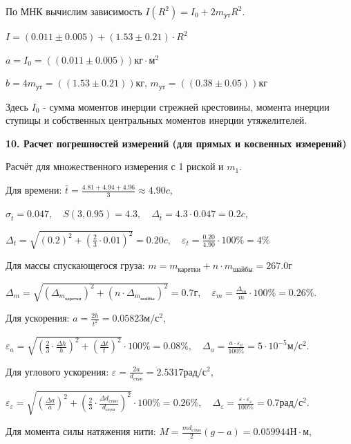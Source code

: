 \documentclass[14pt]{extreport}
\begin{document}
По МНК вычислим зависимость $I(R^2) = I_0+2m_\text{ут}R^2$.

\centerline{$I = (0.011 \pm 0.005)+(1.53 \pm 0.21) \cdot R^2$}

$a = I_0 = ((0.011 \pm 0.005)) \text{кг}\cdot\text{м}^2$

$b = 4m_\text{ут} = ((1.53 \pm 0.21)) \text{кг}$, $m_\text{ут} = ((0.38 \pm 0.05)) \text{кг}$

Здесь $I_0$ - сумма моментов инерции стрежней крестовины, момента инерции ступицы и собственных центральных моментов инерции утяжелителей.

\noindent\textbf{10. Расчет погрешностей измерений (для прямых и косвенных измерений)}

Расчёт для множественного измерения с 1 риской и $m_1$.

Для времени: $\bar{t} = \frac{4.81 + 4.94 + 4.96 }{3} \approx 4.90 c$,

\centerline{$\sigma_{\bar{t}} = 0.047, \quad S(3, 0.95)=4.3, \quad \Delta_{\bar{t}} = 4.3 \cdot 0.047 = 0.2 c$,}

\centerline{$\Delta_{t} = \sqrt{(0.2)^2 + (\frac{2}{3} \cdot 0.01)^2} = 0.20 c, \quad \varepsilon_{t} = \frac{0.20}{4.90} \cdot 100\% = 4\%$}

Для массы спускающегося груза: $m = m_\text{каретки} + n \cdot m_\text{шайбы} = 267.0 \text{г}$

\centerline{$\Delta_m = \sqrt{(\Delta_{m_\text{каретки}})^2 + (n \cdot \Delta_{m_\text{шайбы}})^2} = 0.7 \text{г}, \quad \varepsilon_{m} = \frac{\Delta_m}{m} \cdot 100\% = 0.26\%$.}

Для ускорения: $a=\frac{2h}{t^2} = 0.05823 \text{м}/\text{с}^2$, 

\centerline{$\varepsilon_{a} = \sqrt{(\frac{2}{3} \cdot \frac{\Delta h}{h})^2 + (\frac{\Delta t}{t})^2} \cdot 100\% = 0.08\%, \quad \Delta_a=\frac{a \cdot \varepsilon_a}{100\%} = 5 \cdot 10^{-5} \text{м}/\text{с}^2$.}

Для углового ускорения: $\varepsilon=\frac{2a}{d_\text{ступ}} = 2.5317 \text{рад}/\text{с}^2$, 

\centerline{$\varepsilon_{\varepsilon} = \sqrt{(\frac{\Delta a}{a})^2 + (\frac{2}{3} \cdot \frac{\Delta d_\text{ступ}}{d_\text{ступ}})^2} \cdot 100\% = 0.26\%, \quad \Delta_\varepsilon=\frac{\varepsilon \cdot \varepsilon_\varepsilon}{100\%} = 0.7 \text{рад}/\text{с}^2$.}

Для момента силы натяжения нити: $M=\frac{md_\text{ступ}}{2}(g-a) = 0.059944 \text{Н}\cdot\text{м}$, 
\end{document}
